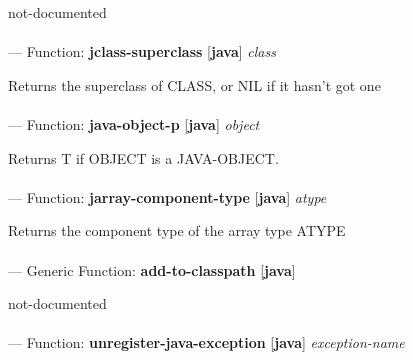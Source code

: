 \begin{adjustwidth}{5em}{5em}
not-documented
\end{adjustwidth}

\paragraph{}
\label{JAVA:JCLASS-SUPERCLASS}
--- Function: \textbf{jclass-superclass} [\textbf{java}] \textit{class}

\begin{adjustwidth}{5em}{5em}
Returns the superclass of CLASS, or NIL if it hasn't got one
\end{adjustwidth}

\paragraph{}
\label{JAVA:JAVA-OBJECT-P}
--- Function: \textbf{java-object-p} [\textbf{java}] \textit{object}

\begin{adjustwidth}{5em}{5em}
Returns T if OBJECT is a JAVA-OBJECT.
\end{adjustwidth}

\paragraph{}
\label{JAVA:JARRAY-COMPONENT-TYPE}
--- Function: \textbf{jarray-component-type} [\textbf{java}] \textit{atype}

\begin{adjustwidth}{5em}{5em}
Returns the component type of the array type ATYPE
\end{adjustwidth}

\paragraph{}
\label{JAVA:ADD-TO-CLASSPATH}
--- Generic Function: \textbf{add-to-classpath} [\textbf{java}] \textit{}

\begin{adjustwidth}{5em}{5em}
not-documented
\end{adjustwidth}

\paragraph{}
\label{JAVA:UNREGISTER-JAVA-EXCEPTION}
--- Function: \textbf{unregister-java-exception} [\textbf{java}] \textit{exception-name}

